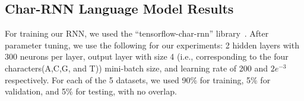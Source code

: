 \subsection{Char-RNN Language Model Results}
For training our RNN, we used the ``tensorflow-char-rnn'' library~\cite{45381}. After parameter tuning, we use the following for our experiments: 2 hidden layers with 300 neurons per layer, output layer with size 4 (i.e., corresponding to the four characters(A,C,G, and T)) mini-batch size, and learning rate of 200 and $2 e^{-3}$ respectively.
For each of the 5 datasets, we used 90\% for training, 5\% for validation, and 5\% for testing, with no overlap.

